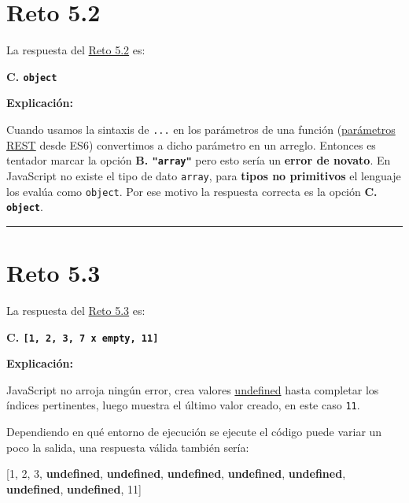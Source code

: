 \documentclass[
  letterpaper,
  DIV=11,
  numbers=noendperiod]{scrreprt}
\newenvironment{Shaded}{\begin{snugshade}}{\end{snugshade}}
\newcommand{\DecValTok}[1]{\textcolor[rgb]{0.68,0.00,0.00}{#1}}
\newcommand{\KeywordTok}[1]{\textcolor[rgb]{0.00,0.23,0.31}{\textbf{#1}}}
\newcommand{\NormalTok}[1]{\textcolor[rgb]{0.00,0.23,0.31}{#1}}
\newcommand{\OperatorTok}[1]{\textcolor[rgb]{0.37,0.37,0.37}{#1}}
\begin{document}
\section{Reto 5.2}\label{sec-sol-cap5-reto2}

La respuesta del \hyperref[sec-cap5-reto2]{Reto 5.2} es:

\textbf{C. \texttt{object}}

\textbf{Explicación:}

Cuando usamos la sintaxis de \texttt{...} en los parámetros de una
función (\hyperref[glos-parametros-rest]{parámetros REST} desde ES6)
convertimos a dicho parámetro en un arreglo. Entonces es tentador marcar
la opción \textbf{B. \texttt{"array"}} pero esto sería un \textbf{error
de novato}. En JavaScript no existe el tipo de dato \texttt{array}, para
\textbf{tipos no primitivos} el lenguaje los evalúa como
\texttt{object}. Por ese motivo la respuesta correcta es la opción
\textbf{C. \texttt{object}}.

\begin{center}\rule{0.5\linewidth}{0.5pt}\end{center}

\section{Reto 5.3}\label{sec-sol-cap5-reto3}

La respuesta del \hyperref[sec-cap5-reto3]{Reto 5.3} es:

\textbf{C. \texttt{{[}1,\ 2,\ 3,\ 7\ x\ empty,\ 11{]}}}

\textbf{Explicación:}

JavaScript no arroja ningún error, crea valores
\hyperref[glos-undefined]{undefined} hasta completar los índices
pertinentes, luego muestra el último valor creado, en este caso
\texttt{11}.

Dependiendo en qué entorno de ejecución se ejecute el código puede
variar un poco la salida, una respuesta válida también sería:

\begin{Shaded}
\begin{Highlighting}[]
\NormalTok{[}\DecValTok{1}\OperatorTok{,} \DecValTok{2}\OperatorTok{,} \DecValTok{3}\OperatorTok{,} \KeywordTok{undefined}\OperatorTok{,} \KeywordTok{undefined}\OperatorTok{,} \KeywordTok{undefined}\OperatorTok{,} \KeywordTok{undefined}\OperatorTok{,} 
\KeywordTok{undefined}\OperatorTok{,} \KeywordTok{undefined}\OperatorTok{,} \KeywordTok{undefined}\OperatorTok{,} \DecValTok{11}\NormalTok{]}
\end{Highlighting}
\end{Shaded}
\end{document}
